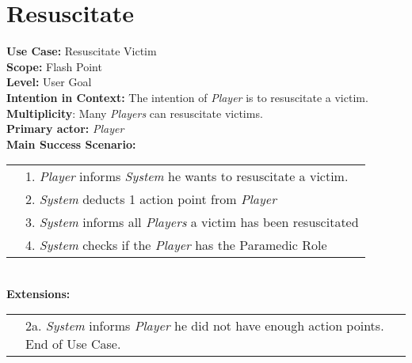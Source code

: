 \documentclass{article}
\begin{document}
	\section*{Resuscitate}
	\textbf{Use Case:} Resuscitate Victim\\
	\textbf{Scope:} Flash Point\\
	\textbf{Level:} User Goal\\
	\textbf{Intention in Context:} The intention of \textit{Player} is to resuscitate a victim.\\
	\textbf{Multiplicity}: Many \textit{Players} can resuscitate victims.\\
	\textbf{Primary actor:} \textit{Player}\\
	\textbf{Main Success Scenario:}\\
	\begin{tabular}{l l}
		&1. \textit{Player} informs \textit{System} he wants to resuscitate a victim.\\
		&2. \textit{System} deducts 1 action point from \textit{Player}\\
		&3. \textit{System} informs all \textit{Players} a victim has been resuscitated\\
		&4. \textit{System} checks if the \textit{Player} has the Paramedic Role\\
	\end{tabular}\\
	\textbf{Extensions:}\\
	\begin{tabular}{l l}
		&2a. \textit{System} informs \textit{Player} he did not have enough action points. End of Use Case.
	\end{tabular}
\end{document}
